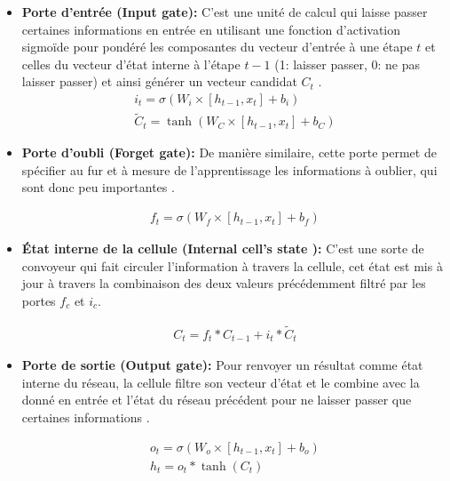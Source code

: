 		\begin{itemize}
			\item \textbf{Porte d'entrée (Input gate): } C'est une unité de calcul qui laisse passer certaines informations en entrée en utilisant une fonction d'activation sigmoïde pour pondéré les composantes du vecteur d'entrée à une étape $t$ et celles du vecteur d'état interne à l'étape $t-1$ (1: laisser passer, 0: ne pas laisser passer) et ainsi générer un vecteur candidat $C_t$ \cite{lstm_original_paper}.
			\begin{equation}
			\begin{gathered}
			i_t = \sigma(W_i \times [h_{t-1},x_t] + b_i) \\
			\tilde{C}_t = \tanh(W_C \times [h_{t-1},x_t] + b_C)
			\end{gathered}
			\end{equation}
			
			\item \textbf{Porte d'oubli (Forget gate): } De manière similaire, cette porte permet de spécifier au fur et à mesure de l'apprentissage les informations à oublier, qui sont donc peu importantes \cite{lstm_original_paper}\cite{rnn_lstms}.
			
			\begin{equation}
			\begin{gathered}
			f_t = \sigma(W_f \times [h_{t-1},x_t] + b_f)
			\end{gathered}
			\end{equation}
			
			\item \textbf{État interne de la cellule (Internal cell's state ): } C'est une sorte de convoyeur qui fait circuler l'information à travers la cellule, cet état est mis à jour à travers la combinaison des deux valeurs précédemment filtré par les portes $f_c$ et $i_c$\cite{lstm_original_paper}.
			
			\begin{equation}
			\begin{gathered}
			C_t = f_t * C_{t-1} + i_t*\tilde{C}_t
			\end{gathered}
			\end{equation}
			 
			\item \textbf{Porte de sortie (Output gate): } Pour renvoyer un résultat comme état interne du réseau, la cellule filtre son vecteur d'état et le combine avec la donné en entrée et l'état du réseau précédent pour ne laisser passer que certaines informations \cite{rnns_online}\cite{lstm_original_paper}\cite{rnn_lstms}.
			
			\begin{equation}
			\begin{gathered}
			o_t =  \sigma(W_o \times [h_{t-1},x_t] + b_o) \\
			h_t = o_t * \tanh(C_t)
			\end{gathered}
			\end{equation}
		\end{itemize}
	
